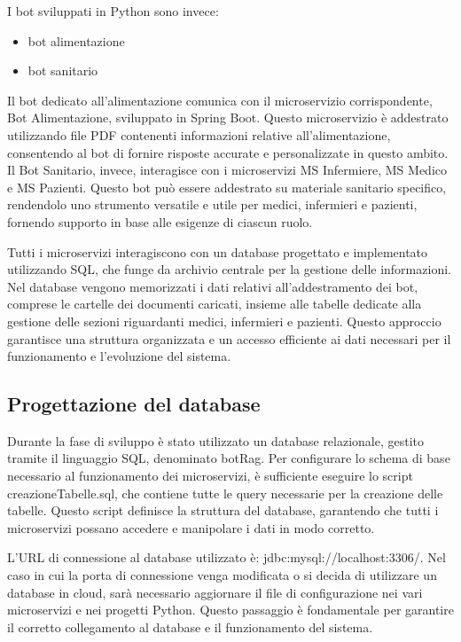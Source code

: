 \documentclass[a4paper,twoside,12pt]{toptesi}
\begin{document}
I bot sviluppati in Python sono invece:
\begin{itemize}
\item bot alimentazione
\item bot sanitario
\end{itemize}

Il bot dedicato all'alimentazione comunica con il microservizio corrispondente, Bot Alimentazione, sviluppato in Spring Boot. Questo microservizio è addestrato utilizzando file PDF contenenti informazioni relative all'alimentazione, consentendo al bot di fornire risposte accurate e personalizzate in questo ambito. Il Bot Sanitario, invece, interagisce con i microservizi MS Infermiere, MS Medico e MS Pazienti. Questo bot può essere addestrato su materiale sanitario specifico, rendendolo uno strumento versatile e utile per medici, infermieri e pazienti, fornendo supporto in base alle esigenze di ciascun ruolo.

Tutti i microservizi interagiscono con un database progettato e implementato utilizzando SQL, che funge da archivio centrale per la gestione delle informazioni. Nel database vengono memorizzati i dati relativi all'addestramento dei bot, comprese le cartelle dei documenti caricati, insieme alle tabelle dedicate alla gestione delle sezioni riguardanti medici, infermieri e pazienti. Questo approccio garantisce una struttura organizzata e un accesso efficiente ai dati necessari per il funzionamento e l'evoluzione del sistema.

\subsection{Progettazione del database}
Durante la fase di sviluppo è stato utilizzato un database relazionale, gestito tramite il linguaggio SQL, denominato botRag. Per configurare lo schema di base necessario al funzionamento dei microservizi, è sufficiente eseguire lo script creazioneTabelle.sql, che contiene tutte le query necessarie per la creazione delle tabelle. Questo script definisce la struttura del database, garantendo che tutti i microservizi possano accedere e manipolare i dati in modo corretto. 

L'URL di connessione al database utilizzato è: jdbc:mysql://localhost:3306/. Nel caso in cui la porta di connessione venga modificata o si decida di utilizzare un database in cloud, sarà necessario aggiornare il file di configurazione nei vari microservizi e nei progetti Python. Questo passaggio è fondamentale per garantire il corretto collegamento al database e il funzionamento del sistema.
\\
\end{document}

